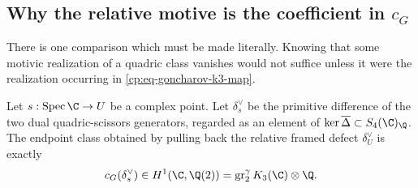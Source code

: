 \subsection{Why the relative motive is the coefficient in
\texorpdfstring{\(c_G\)}{cG}}

There is one comparison which must be made literally.  Knowing that some
motivic realization of a quadric class vanishes would not suffice unless it
were the realization occurring in \eqref{cp:eq-goncharov-k3-map}.

\begin{lemma}
\label{cp:lem-fibre-comparison}
Let \(s:\Spec\C\to U\) be a complex point.  Let \(\delta_s^\vee\) be the
primitive difference of the two dual quadric-scissors generators, regarded
as an element of \(\ker\overline\Delta\subset S_4(\C)_\Q\).  The endpoint
class obtained by pulling back the relative framed
defect \(\delta_U^\vee\) is exactly
\[
 c_G(\delta_s^\vee)
 \in H^1(\C,\Q(2))
 =\gr_2^\gamma K_3(\C)\otimes\Q.
\]
\end{lemma}

